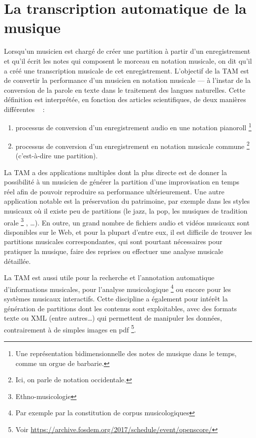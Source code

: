 \section{La transcription automatique de la musique}
Lorsqu’un musicien est chargé de créer une partition à partir d’un
enregistrement et qu’il écrit les notes qui composent le morceau en notation
musicale, on dit qu’il a créé une transcription musicale de cet enregistrement.
L’objectif de la TAM \cite{future_directions} est de convertir la performance
d’un musicien en notation musicale — à l’instar de la conversion de la parole
en texte dans le traitement des langues naturelles. Cette définition est
interprétée, en fonction des articles scientifiques, de deux manières
différentes ~ :
\begin{enumerate}
    \item processus de conversion d’un enregistrement audio en une notation
        pianoroll \footnote{Une représentation bidimensionnelle des notes de
            musique dans le temps, comme un orgue de barbarie.}
    \item processus de conversion d’un enregistrement en notation musicale
        commune \footnote{Ici, on parle de notation occidentale.} (c’est-à-dire
        une partition).\\
\end{enumerate}

La TAM a des applications multiples \cite{future_directions} dont la plus
directe est de donner la possibilité à un musicien de générer la partition
d’une improvisation en temps réel afin de pouvoir reproduire sa performance
ultérieurement. Une autre application notable est la préservation du
patrimoine, par exemple dans les styles musicaux où il existe peu de partitions
(le jazz, la pop, les musiques de tradition orale \footnote{Ethno-musicologie}
, …). En outre, un grand nombre de fichiers audio et vidéos musicaux sont
disponibles sur le Web, et pour la plupart d’entre eux, il est difficile de
trouver les partitions musicales correspondantes, qui sont pourtant nécessaires
pour pratiquer la musique, faire des reprises ou effectuer une analyse musicale
détaillée.

La TAM est aussi utile pour la recherche et l’annotation automatique
d’informations musicales, pour l’analyse musicologique \footnote{Par exemple
par la constitution de corpus musicologiques} ou encore pour les systèmes
musicaux interactifs. Cette discipline a également pour intérêt la génération
de partitions dont les contenus sont exploitables, avec des formats texte ou
XML (entre autres…) qui permettent de manipuler les données, contrairement à de
simples images en pdf \footnote{Voir \url{
    https://archive.fosdem.org/2017/schedule/event/openscore/}}.\\

